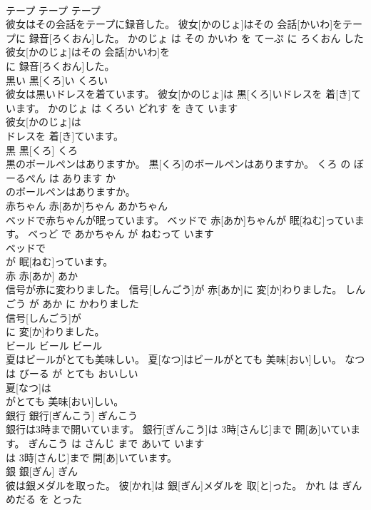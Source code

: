 \documentclass[8pt]{extreport}
\begin{document}
\begin{CJK}{UTF8}{min}
\\	テープ	テープ	テープ	
\\	彼女はその会話をテープに録音した。	彼女[かのじょ]はその 会話[かいわ]をテープに 録音[ろくおん]した。	かのじょ は その かいわ を てーぷ に ろくおん した	
\\	彼女[かのじょ]はその 会話[かいわ]を
\\	に 録音[ろくおん]した。		
\\	黒い	黒[くろ]い	くろい	
\\	彼女は黒いドレスを着ています。	彼女[かのじょ]は 黒[くろ]いドレスを 着[き]ています。	かのじょ は くろい どれす を きて います	
\\	彼女[かのじょ]は
\\	ドレスを 着[き]ています。		
\\	黒	黒[くろ]	くろ	
\\	黒のボールペンはありますか。	黒[くろ]のボールペンはありますか。	くろ の ぼーるぺん は あります か	
\\	のボールペンはありますか。		
\\	赤ちゃん	赤[あか]ちゃん	あかちゃん	
\\	ベッドで赤ちゃんが眠っています。	ベッドで 赤[あか]ちゃんが 眠[ねむ]っています。	べっど で あかちゃん が ねむって います	
\\	ベッドで
\\	が 眠[ねむ]っています。		
\\	赤	赤[あか]	あか	
\\	信号が赤に変わりました。	信号[しんごう]が 赤[あか]に 変[か]わりました。	しんごう が あか に かわりました	
\\	信号[しんごう]が
\\	に 変[か]わりました。		
\\	ビール	ビール	ビール	
\\	夏はビールがとても美味しい。	夏[なつ]はビールがとても 美味[おい]しい。	なつ は びーる が とても おいしい	
\\	夏[なつ]は
\\	がとても 美味[おい]しい。		
\\	銀行	銀行[ぎんこう]	ぎんこう	
\\	銀行は3時まで開いています。	銀行[ぎんこう]は 3時[さんじ]まで 開[あ]いています。	ぎんこう は さんじ まで あいて います	
\\	は 3時[さんじ]まで 開[あ]いています。		
\\	銀	銀[ぎん]	ぎん	
\\	彼は銀メダルを取った。	彼[かれ]は 銀[ぎん]メダルを 取[と]った。	かれ は ぎんめだる を とった	

\end{CJK}
\end{document}
